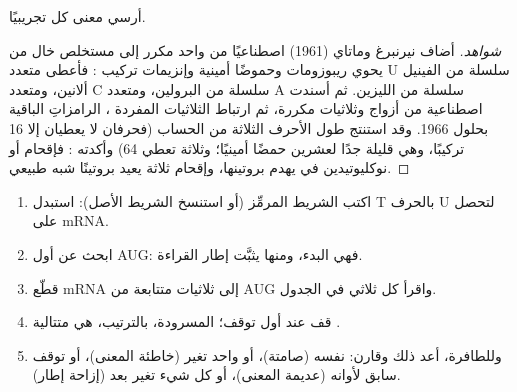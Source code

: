 \begin{proposition}\label{prop:g11:gene-expression:readcode}
أرسي معنى كل  تجريبيًا.
\end{proposition}
\begin{proof}[شواهد]
أضاف نيرنبرغ وماتاي (1961)  اصطناعيًا من  واحد مكرر إلى
مستخلص خال من  يحوي ريبوزومات وحموضًا أمينية وإنزيمات تركيب
: فأعطى متعدد U سلسلة من الفينيل ألانين، ومتعدد C سلسلة من
البرولين، ومتعدد A سلسلة من الليزين. ثم أسندت  اصطناعية من أزواج
وثلاثيات مكررة، ثم ارتباط الثلاثيات المفردة ، الرامزاتِ
الباقية بحلول 1966. وقد استنتج طول الأحرف الثلاثة من الحساب (فحرفان لا
يعطيان إلا 16 تركيبًا، وهي قليلة جدًا لعشرين حمضًا أمينيًا؛ وثلاثة
تعطي 64) وأكدته : فإقحام  أو نوكليوتيدين في 
يهدم بروتينها، وإقحام ثلاثة يعيد بروتينًا شبه طبيعي.
\end{proof}

\begin{method}\label{met:g11:gene-expression:translate}
\begin{enumerate}
  \item اكتب الشريط المرمِّز (أو استنسخ الشريط الأصل): استبدل T بالحرف U
        لتحصل على mRNA.
  \item ابحث عن أول AUG: فهي البدء، ومنها يثبَّت إطار القراءة.
  \item قطّع mRNA إلى ثلاثيات متتابعة من AUG واقرأ كل ثلاثي في
        الجدول.
  \item قف عند أول  توقف؛  المسرودة، بالترتيب،
        هي متتالية .
  \item وللطافرة، أعد ذلك وقارن:  نفسه (صامتة)، أو 
        واحد تغير (خاطئة المعنى)، أو توقف سابق لأوانه (عديمة المعنى)،
        أو كل شيء تغير بعد  (إزاحة إطار).
\end{enumerate}
\end{method}

